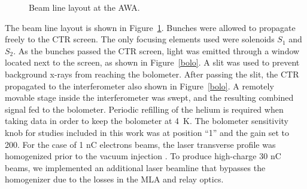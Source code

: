 \begin{figure}%
	\centering
	\begin{tikzpicture}[scale=0.8, text=black]
	
	\end{tikzpicture}	
	\caption{Beam line layout at the AWA.}
	\label{beamline}
\end{figure}
The beam line layout is shown in Figure~\ref{beamline}. 
Bunches were allowed to propagate freely to the 
CTR screen. The only focusing elements used were solenoids $S_1$ and
$S_2$. As the bunches passed the CTR screen, light was
emitted through a window located next to the screen, 
as shown in Figure~\ref{bolo}. A slit was used to prevent
background x-rays from reaching the bolometer.
After passing the slit, the CTR propagated to the 
interferometer also shown in Figure~\ref{bolo}.  %
A remotely movable stage inside the interferometer was swept, 
and the resulting combined signal fed to the bolometer. 
Periodic refilling of the helium is required when taking data in order
to keep the bolometer at \SI{4}{K}. The bolometer sensitivity knob for studies included in this work was at position ``1'' and
the gain set to 200.
For the case of 1 nC electrons beams, the laser transverse profile was homogenized prior to the vacuum injection \cite{PhysRevAccelBeams.20.103404}.
To produce high-charge 30 nC beams, we implemented an additional laser beamline that bypasses the homogenizer due to the losses in the 
MLA and relay optics.

